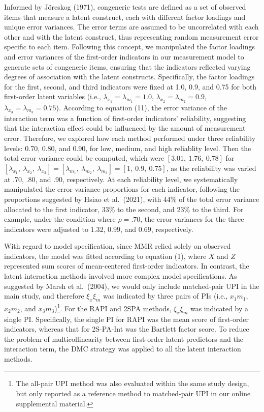 \documentclass[
  man]{apa6}
\begin{document}
Informed by Jöreskog (1971), congeneric tests are defined as a set of observed items that measure a latent construct, each with different factor loadings and unique error variances. The error terms are assumed to be uncorrelated with each other and with the latent construct, thus representing random measurement error specific to each item. Following this concept, we manipulated the factor loadings and error variances of the first-order indicators in our measurement model to generate sets of congeneric items, ensuring that the indicators reflected varying degrees of association with the latent constructs. Specifically, the factor loadings for the first, second, and third indicators were fixed at 1.0, 0.9, and 0.75 for both first-order latent variables (i.e., \(\lambda_{x_{1}} = \lambda_{m_{1}} = 1.0\), \(\lambda_{x_{2}} = \lambda_{m_{2}} = 0.9\), \(\lambda_{x_{3}} = \lambda_{m_{3}} = 0.75\)). According to equation (11), the error variance of the interaction term was a function of first-order indicators' reliability, suggesting that the interaction effect could be influenced by the amount of measurement error. Therefore, we explored how each method performed under three reliability levels: 0.70, 0.80, and 0.90, for low, medium, and high reliablity level. Then the total error variance could be computed, which were \([3.01, \ 1.76, \ 0.78]\) for \([\lambda_{x_{1}}, \ \lambda_{x_{2}}, \ \lambda_{x_{3}}] = [\lambda_{m_{1}}, \ \lambda_{m_{2}}, \ \lambda_{m_{3}}] = [1, \ 0.9, \ 0.75]\), as the reliability was varied at .70, .80, and .90, respectively. At each reliability level, we systematically manipulated the error variance proportions for each indicator, following the proportions suggested by Hsiao et al.~(2021), with 44\% of the total error variance allocated to the first indicator, 33\% to the second, and 23\% to the third. For example, under the condition where \(\rho = .70\), the error variances for the three indicators were adjusted to \(1.32\), \(0.99\), and \(0.69\), respectively.

With regard to model specification, since MMR relied solely on observed indicators, the model was fitted according to equation (1), where \(X\) and \(Z\) represented sum scores of mean-centered first-order indicators. In contrast, the latent interaction methods involved more complex model specifications. As suggested by Marsh et al.~(2004), we would only include matched-pair UPI in the main study, and therefore \(\xi_{x}\xi_{m}\) was indicated by three pairs of PIs (i.e., \(x_{1}m_{1}\), \(x_{2}m_{2}\), and \(x_{3}m_{3}\))\footnote{The all-pair UPI method was also evaluated within the same study design, but only reported as a reference method to matched-pair UPI in our online supplemental material.}. For the RAPI and 2SPA methods, \(\xi_{x}\xi_{m}\) was indicated by a single PI. Specifically, the single PI for RAPI was the mean score of first-order indicators, whereas that for 2S-PA-Int was the Bartlett factor score. To reduce the problem of multicollinearity between first-order latent predictors and the interaction term, the DMC strategy was applied to all the latent interaction methods.
\end{document}
